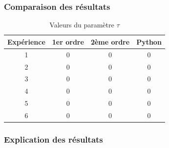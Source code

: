 \documentclass{beamer}
\begin{document}
\begin{frame}
\frametitle{Comparaison des résultats}

\begin{table}[htdp]
\begin{center}\begin{tabular}{|c|c|c|c|}
\hline
Expérience & 1er ordre & 2ème ordre & Python \\
\hline
1 & 0 & 0 & 0 \\
2 & 0 & 0 & 0 \\
3 & 0 & 0 & 0 \\
4 & 0 & 0 & 0 \\
5 & 0 & 0 & 0 \\
6 & 0 & 0 & 0\\
\hline
\end{tabular} 
\caption{Valeurs du paramètre $\tau$}
\end{center}
\label{defaulttable}
\end{table}

\end{frame}





\begin{frame}
\frametitle{Explication des résultats}

\end{frame}
\end{document}
